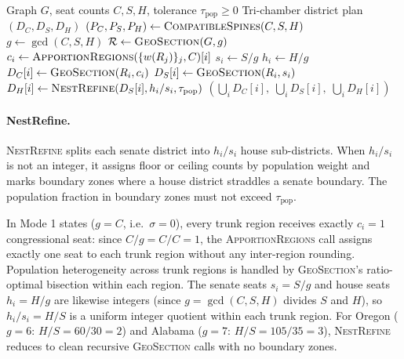 \begin{algorithm}
\caption{\textsc{NestSection}$(G, C, S, H, \tau_\text{pop})$}
\label{alg:nestsection}
\begin{algorithmic}[1]
\Require Graph $G$, seat counts $C, S, H$, tolerance $\tau_\text{pop} \geq 0$
\Ensure Tri-chamber district plan $(D_C, D_S, D_H)$
\State $(P_C, P_S, P_H) \leftarrow \textsc{CompatibleSpines}(C, S, H)$
\State $g \leftarrow \gcd(C, S, H)$
\State $\mathcal{R} \leftarrow \textsc{GeoSection}(G, g)$
  \State $c_i \leftarrow \textsc{ApportionRegions}(\{w(R_j)\}_j, C)[i]$
  \State $s_i \leftarrow S / g$
  \State $h_i \leftarrow H / g$
  \State $D_C[i] \leftarrow \textsc{GeoSection}(R_i, c_i)$
  \State $D_S[i] \leftarrow \textsc{GeoSection}(R_i, s_i)$
  \State $D_H[i] \leftarrow \textsc{NestRefine}(D_S[i], h_i / s_i, \tau_\text{pop})$
\EndFor
\State \Return $(\bigcup_i D_C[i],\; \bigcup_i D_S[i],\; \bigcup_i D_H[i])$
\end{algorithmic}
\end{algorithm}

\paragraph{NestRefine.}  \textsc{NestRefine} splits each senate district into
$h_i / s_i$ house sub-districts.  When $h_i / s_i$ is not an integer, it
assigns floor or ceiling counts by population weight and marks boundary zones
where a house district straddles a senate boundary.  The population fraction
in boundary zones must not exceed $\tau_\text{pop}$.

\begin{remark}
\label{rem:mode1-uniformity}
In Mode 1 states ($g = C$, i.e.\ $\sigma = 0$), every trunk region receives
exactly $c_i = 1$ congressional seat: since $C/g = C/C = 1$, the
\textsc{ApportionRegions} call assigns exactly one seat to each trunk region
without any inter-region rounding.
Population heterogeneity across trunk regions is handled by
\textsc{GeoSection}'s ratio-optimal bisection within each region.
The senate seats $s_i = S/g$ and house seats $h_i = H/g$ are likewise
integers (since $g = \gcd(C,S,H)$ divides $S$ and $H$), so
$h_i/s_i = H/S$ is a uniform integer quotient within each trunk region.
For Oregon ($g=6$: $H/S = 60/30 = 2$) and Alabama ($g=7$: $H/S = 105/35 = 3$),
\textsc{NestRefine} reduces to clean recursive \textsc{GeoSection} calls
with no boundary zones.
\end{remark}

